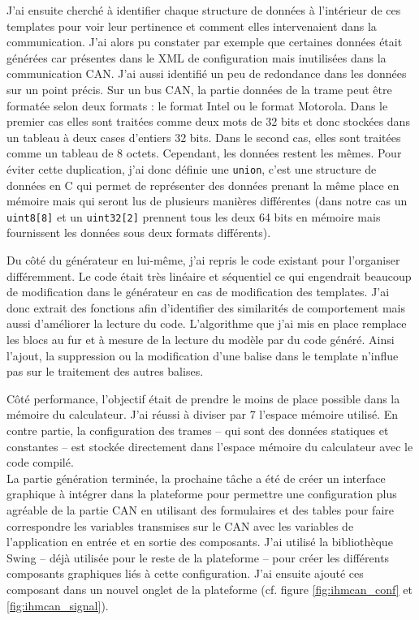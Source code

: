 J'ai ensuite cherché à identifier chaque structure de données à l'intérieur de
ces templates pour voir leur pertinence et comment elles intervenaient dans la
communication. J'ai alors pu constater par exemple que certaines données était
générées car présentes dans le XML de configuration mais inutilisées dans la
communication CAN. J'ai aussi identifié un peu de redondance dans les données
sur un point précis. Sur un bus CAN, la partie données de la trame peut être
formatée selon deux formats : le format Intel ou le format Motorola. Dans le
premier cas elles sont traitées comme deux mots de 32 bits et donc stockées dans
un tableau à deux cases d'entiers 32 bits. Dans le second cas, elles sont
traitées comme un tableau de 8 octets. Cependant, les données restent les mêmes.
Pour éviter cette duplication, j'ai donc définie une {\tt union}, c'est une
structure de données en C qui permet de représenter des données prenant la même
place en mémoire mais qui seront lus de plusieurs manières différentes (dans
notre cas un {\tt uint8[8]} et un {\tt uint32[2]} prennent tous les deux 64 bits
en mémoire mais fournissent les données sous deux formats différents).

Du côté du générateur en lui-même, j'ai repris le code existant pour l'organiser
différemment. Le code était très linéaire et séquentiel ce qui engendrait
beaucoup de modification dans le générateur en cas de modification des
templates. J'ai donc extrait des fonctions afin d'identifier des similarités de
comportement mais aussi d'améliorer la lecture du code. L'algorithme que j'ai
mis en place remplace les blocs au fur et à mesure de la lecture du modèle par
du code généré. Ainsi l'ajout, la suppression ou la modification d'une balise
dans le template n'influe pas sur le traitement des autres balises.

Côté performance, l'objectif était de prendre le moins de place possible dans la
mémoire du calculateur. J'ai réussi à diviser par 7 l'espace mémoire utilisé. En
contre partie, la configuration des trames -- qui sont des données statiques et
constantes -- est stockée directement dans l'espace mémoire du calculateur avec
le code compilé.\\

La partie génération terminée, la prochaine tâche a été de créer un interface
graphique à intégrer dans la plateforme pour permettre une configuration plus
agréable de la partie CAN en utilisant des formulaires et des tables pour faire
correspondre les variables transmises sur le CAN avec les variables de
l'application en entrée et en sortie des composants. J'ai utilisé la
bibliothèque Swing -- déjà utilisée pour le reste de la plateforme -- pour
créer les différents composants graphiques liés à cette configuration. J'ai
ensuite ajouté ces composant dans un nouvel onglet de la plateforme (cf. figure
\ref{fig:ihmcan_conf} et \ref{fig:ihmcan_signal}).


